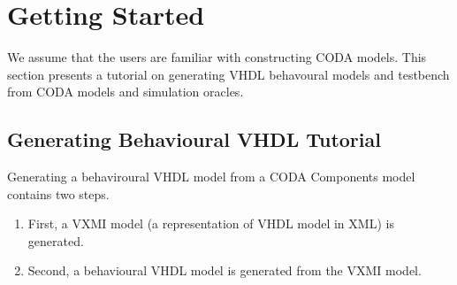 \section{Getting Started}
\label{sec:vhdl-getting-started}

We assume that the users are familiar with constructing CODA models.  This section presents a tutorial on generating VHDL behavoural models and testbench from CODA models and simulation oracles.

\subsection{Generating Behavioural VHDL Tutorial}
\label{sec:vhdl-generate-behavioural-model-tutorial}
Generating a behaviroural VHDL model from a CODA Components model contains two steps.
\begin{enumerate}
\item First, a VXMI model (a representation of VHDL model in XML) is generated.

\item Second, a behavioural VHDL model is generated from the VXMI model.
\end{enumerate}

